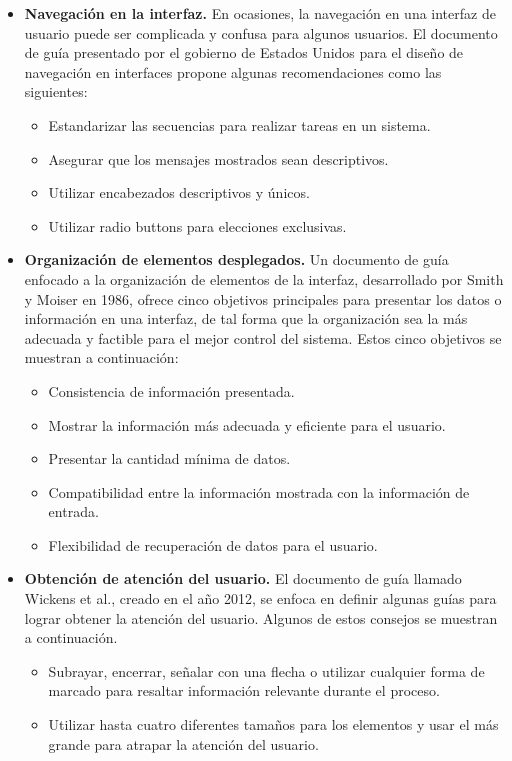 \begin{itemize}
  \item \textbf{Navegación en la interfaz.} En ocasiones, la navegación en una interfaz de usuario puede ser complicada y confusa para algunos usuarios. El documento de guía presentado por el gobierno de Estados Unidos para el diseño de navegación en interfaces propone algunas recomendaciones como las siguientes:
  \begin{itemize}
    \item Estandarizar las secuencias para realizar tareas en un sistema.
    \item Asegurar que los mensajes mostrados sean descriptivos. 
    \item Utilizar encabezados descriptivos y únicos.
    \item Utilizar radio buttons para elecciones exclusivas.
  \end{itemize} 
  \item \textbf{Organización de elementos desplegados.} Un documento de guía enfocado a la organización de elementos de la interfaz, desarrollado por Smith y Moiser en 1986, ofrece cinco objetivos principales para presentar los datos o información en una interfaz, de tal forma que la organización sea la más adecuada y factible para el mejor control del sistema. Estos cinco objetivos se muestran a continuación:
  \begin{itemize}
    \item Consistencia de información presentada.
    \item Mostrar la información más adecuada y eficiente para el usuario.
    \item Presentar la cantidad mínima de datos.
    \item Compatibilidad entre la información mostrada con la información de entrada.
    \item Flexibilidad de recuperación de datos para el usuario.
  \end{itemize}
  \item \textbf{Obtención de atención del usuario.} El documento de guía llamado Wickens et al., creado en el año 2012, se enfoca en definir algunas guías para lograr obtener la atención del usuario. Algunos de estos consejos se muestran a continuación.
  \begin{itemize}
    \item Subrayar, encerrar, señalar con una flecha o utilizar cualquier forma de marcado para resaltar información relevante durante el proceso.
    \item Utilizar hasta cuatro diferentes tamaños para los elementos y usar el más grande para atrapar la atención del usuario.

\end{itemize}
\end{itemize}
